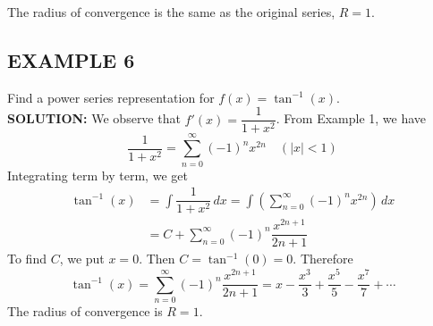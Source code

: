 \documentclass{article}
\theoremstyle{mystyle}
\begin{document}
The radius of convergence is the same as the original series, \(R=1\).

\subsection*{EXAMPLE 6}
Find a power series representation for \(f(x) = \tan^{-1}(x)\).\\
\textbf{SOLUTION:}
We observe that \(f'(x) = \dfrac{1}{1+x^2}\). From Example 1, we have
\[ \dfrac{1}{1+x^2} = \sum_{n=0}^{\infty} (-1)^n x^{2n} \quad (|x|<1) \]
Integrating term by term, we get
\begin{align*}
    \tan^{-1}(x) &= \int \dfrac{1}{1+x^2} \,dx = \int \left( \sum_{n=0}^{\infty} (-1)^n x^{2n} \right) \,dx \\
    &= C + \sum_{n=0}^{\infty} (-1)^n \dfrac{x^{2n+1}}{2n+1}
\end{align*}
To find \(C\), we put \(x=0\). Then \(C = \tan^{-1}(0) = 0\). Therefore
\[ \tan^{-1}(x) = \sum_{n=0}^{\infty} (-1)^n \dfrac{x^{2n+1}}{2n+1} = x - \dfrac{x^3}{3} + \dfrac{x^5}{5} - \dfrac{x^7}{7} + \cdots \]
The radius of convergence is \(R=1\).
\end{document}
